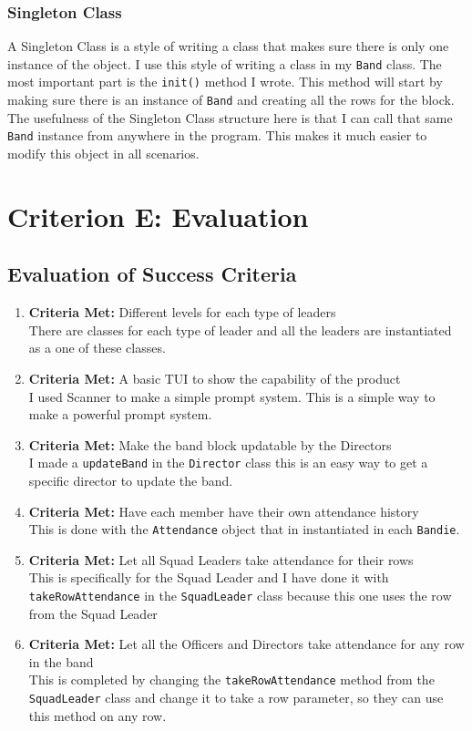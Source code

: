 \documentclass{article}
\begin{document}
\subsubsection{Singleton Class}
A Singleton Class is a style of writing a class that makes sure there is only one instance of the object. I use this style of writing a class in my \verb|Band| class. The most important part is the \verb|init()| method I wrote. This method will start by making sure there is an instance of \verb|Band| and creating all the rows for the block. The usefulness of the Singleton Class structure here is that I can call that same \verb|Band| instance from anywhere in the program. This makes it much easier to modify this object in all scenarios.
\newpage
\section{Criterion E: Evaluation}
\subsection{Evaluation of Success Criteria}
\begin{enumerate}
	\item \textbf{Criteria Met:} Different levels for each type of leaders \\
		There are classes for each type of leader and all the leaders are instantiated as a one of these classes.
	\item \textbf{Criteria Met:} A basic TUI to show the capability of the product\\
		I used Scanner\cite{scanner} to make a simple prompt system. This is a simple way to make a powerful prompt system.
	\item \textbf{Criteria Met:} Make the band block updatable by the Directors\\
		I made a \verb|updateBand| in the \verb|Director| class this is an easy way to get a specific director to update the band.
	\item \textbf{Criteria Met:} Have each member have their own attendance history\\
		This is done with the \verb|Attendance| object that in instantiated in each \verb|Bandie|.
	\item \textbf{Criteria Met:} Let all Squad Leaders take attendance for their rows\\
		This is specifically for the Squad Leader and I have done it with \verb|takeRowAttendance| in the \verb|SquadLeader| class because this one uses the row from the Squad Leader
	\item \textbf{Criteria Met:} Let all the Officers and Directors take attendance for any row in the band\\
		This is completed by changing the \verb|takeRowAttendance| method from the \verb|SquadLeader| class and change it to take a row parameter, so they can use this method on any row.
\end{enumerate}
\end{document}
